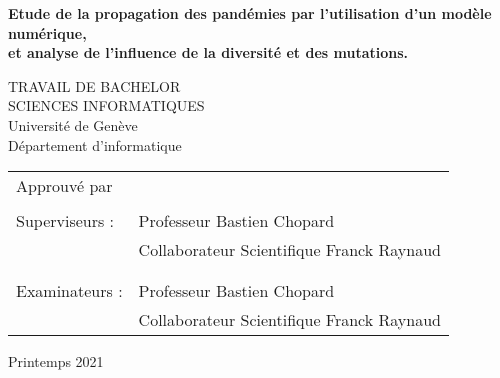 \thispagestyle{empty}

\vspace*{+5em}
\begin{center}
	\textbf{Etude de la propagation des pandémies par l’utilisation d’un modèle numérique,} \\
	\textbf{et analyse de l’influence de la diversité et des mutations.}\\
	\vspace*{+4em}

	\vspace{+2em}
	TRAVAIL DE BACHELOR\\
	SCIENCES INFORMATIQUES\\

	\vspace*{+3em}
	Université de Genève\\
	Département d'informatique\\
	\vspace*{+2em}

\end{center}

\begin{tabular}{ l l }
	Approuvé par  &                                           \\
	              &                                           \\
	Superviseurs : & Professeur Bastien Chopard                \\
	              & Collaborateur Scientifique Franck Raynaud \\
	              &                                           \\
	              &                                           \\
	Examinateurs : & Professeur Bastien Chopard                \\
	              & Collaborateur Scientifique Franck Raynaud \\
\end{tabular}

\vspace*{+4em}

\begin{center}
	Printemps 2021
\end{center}

